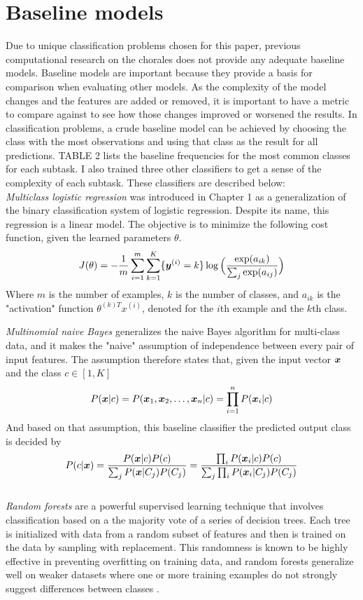 \documentclass[11pt]{article}
\begin{document}
\section{Baseline models}

Due to unique classification problems chosen for this paper, previous computational research on the chorales does not provide any adequate baseline models. Baseline models are important because they provide a basis for comparison when evaluating other models. As the complexity of the model changes and the features are added or removed, it is important to have a metric to compare against to see how those changes improved or worsened the results. In classification problems, a crude baseline model can be achieved by choosing the class with the most observations and using that class as the result for all predictions. TABLE 2 lists the baseline frequencies for the most common classes for each subtask. I also trained three other classifiers to get a sense of the complexity of each subtask. These classifiers are described below: \\
\textit{Multiclass logistic regression} was introduced in Chapter 1 as a generalization of the binary classification system of logistic regression. Despite its name, this regression is a linear model. The objective is to minimize the following cost function, given the learned parameters $\theta$.
$$ J(\theta) = -\frac{1}{m} \sum_{i = 1}^{m} \sum_{k  = 1}^{K} \{ \boldsymbol{y}^{(i)} = k \} \log \Big( \frac{ \exp(a_{ik}) } { \sum_j \exp(a_{ij}) } \Big) $$
Where $m$ is the number of examples, $k$ is the number of classes, and $a_{ik}$ is the "activation" function $\theta^{(k)T} x^{(i)}$, denoted for the $i$th example and the $k$th class.

\textit{Multinomial naive Bayes} generalizes the naive Bayes algorithm for multi-class data, and it makes the "naive" assumption of independence between every pair of input features. The assumption therefore states that, given the input vector $\boldsymbol{x}$ and the class $c \in [1, K]$
$$P(\boldsymbol{x} | c) = P(\boldsymbol{x}_1, \boldsymbol{x}_2, \ldots, \boldsymbol{x}_n | c) = \prod_{i=1}^{n} P(\boldsymbol{x}_i | c)$$
And based on that assumption, this baseline classifier the predicted output class is decided by
$$P(c | \boldsymbol{x}) = \frac{ P(\boldsymbol{x} | c) P(c) }{ \sum_j P(\boldsymbol{x} | C_j) P(C_j) } = \frac{ \prod_i P(\boldsymbol{x}_i | c) P(c) }{ \sum_j \prod_i P(\boldsymbol{x}_i | C_j) P(C_j) }$$\\

\textit{Random forests} are a powerful supervised learning technique that involves classification based on a the majority vote of a series of decision trees. Each tree is initialized with data from a random subset of features and then is trained on the data by sampling with replacement. This randomness is known to be highly effective in preventing overfitting on training data, and random forests generalize well on weaker datasets where one or more training examples do not strongly suggest differences between classes \citep[p.~18]{breiman2001}.
\end{document}
